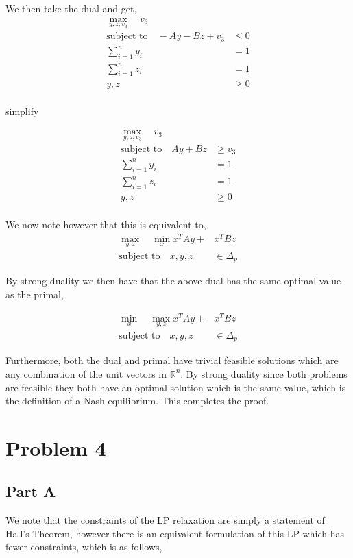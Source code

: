 \documentclass[a4paper]{article}
\begin{document}
We then take the dual and get, 
\begin{align*}
	\max_{y,z,v_3} \quad  v_3\\
	\text{subject to} \quad -Ay - Bz + v_3 &\leq 0 \\
							\sum_{i=1}^ny_i &=1 \\
							\sum_{i=1}^nz_i &=1 \\
							y,z &\geq 0\\
\end{align*}

simplify 

\begin{align*}
	\max_{y,z,v_3} \quad  v_3\\
	\text{subject to} \quad Ay + Bz  &\geq v_3 \\
							\sum_{i=1}^ny_i &=1 \\
							\sum_{i=1}^nz_i &=1 \\
							y,z &\geq 0\\
\end{align*}

We now note however that this is equivalent to, 
\begin{align*}
	\max_{y,z} \quad \min_{x} x^TAy + &x^TBz\\
	\text{subject to} \quad x,y,z &\in \Delta_p
\end{align*}


By strong duality we then have that the above dual has 
the same optimal value as the primal, 

\begin{align*}
	\min_x \quad  \max_{y,z} x^TAy + &x^TBz\\
	\text{subject to} \quad x,y,z &\in \Delta_p
\end{align*}

Furthermore, both the dual and primal have trivial feasible solutions
which are any combination of the unit vectors in $\mathds{R}^n$. By strong duality 
since both problems are feasible they both have an optimal solution which is the same 
value, which is the definition of a Nash equilibrium. This completes the proof.




\section{Problem 4}
\subsection{Part A}
We note that the constraints of the LP relaxation are simply a statement of Hall's Theorem, 
however there is an equivalent formulation of this LP which has fewer constraints, which is as follows,
\end{document}

